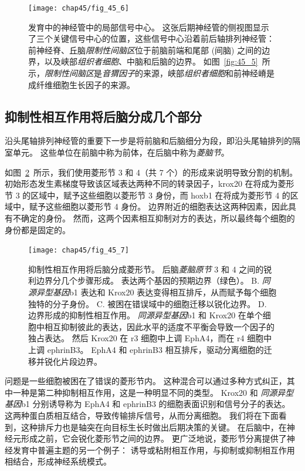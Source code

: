 \begin{figure}[htbp]
	\centering
	\texttt{[image: chap45/fig\_45\_6]}
	\caption{发育中的神经管中的局部信号中心。
		这张后期神经管的侧视图显示了三个关键信号中心的位置，这些信号中心沿着前后轴排列神经管：
		前神经脊、丘脑\textit{限制性间脑区}位于前脑前端和尾部 (间脑) 之间的边界，以及峡部\textit{组织者细胞}、中脑和后脑的边界。
		如图~\ref{fig:45_5}~所示，\textit{限制性间脑区}是\textit{音猬因子}的来源，峡部\textit{组织者细胞}和前神经嵴是成纤维细胞生长因子的来源。}
	\label{fig:45_6}
\end{figure}



\subsection{抑制性相互作用将后脑分成几个部分}

沿头尾轴排列神经管的重要下一步是将前脑和后脑细分为段，即沿头尾轴排列的隔室单元。
这些单位在前脑中称为前体，在后脑中称为\textit{菱脑节}。


如图~\ref{fig:45_7}~所示，我们使用菱形节 3 和 4（共 7 个）的形成来说明导致分割的机制。
初始形态发生素梯度导致该区域表达两种不同的转录因子，krox20 在将成为菱形节 3 的区域中，赋予这些细胞以菱形节 3 身份，而 hoxb1 在将成为菱形节 4 的区域中，赋予这些细胞以菱形节 4 身份。
边界附近的细胞表达这两种因素，因此具有不确定的身份。
然而，这两个因素相互抑制对方的表达，所以最终每个细胞的身份都是固定的。


\begin{figure}[htbp]
	\centering
	\texttt{[image: chap45/fig\_45\_7]}
	\caption{抑制性相互作用将后脑分成菱形节。
		后脑\textit{菱脑原节} 3 和 4 之间的锐利边界分几个步骤形成\cite{addison2016segment}。
		表达两个基因的预期边界（绿色）。
		B. \textit{同源异型基因}b1 表达和 Krox20 表达变得相互排斥，从而赋予每个细胞独特的分子身份。
		C. 被困在错误域中的细胞迁移以锐化边界。
		D. 边界形成的抑制性相互作用。
		\textit{同源异型基因}b1 和 Krox20 在单个细胞中相互抑制彼此的表达，因此水平的适度不平衡会导致一个因子的独占表达。
		然后 Krox20 在 r3 细胞中上调 EphA4，而在 r4 细胞中上调 ephrinB3。
		EphA4 和 ephrinB3 相互排斥，驱动分离细胞的迁移并锐化片段边界。}
	\label{fig:45_7}
\end{figure}


问题是一些细胞被困在了错误的菱形节内。
这种混合可以通过多种方式纠正，其中一种是第二种抑制相互作用，这是一种明显不同的类型。
Krox20 和 \textit{同源异型基因}b1 分别诱导称为 EphA4 和 ephrinB3 的细胞表面识别和信号分子的表达。
这两种蛋白质相互结合，导致传输排斥信号，从而分离细胞。
我们将在下面看到，这种排斥力也是轴突在向目标生长时做出后期决策的关键。
在后脑中，在神经元形成之前，它会锐化菱形节之间的边界。
更广泛地说，菱形节分离提供了神经发育中普遍主题的另一个例子：
诱导或粘附相互作用，与抑制或抑制相互作用相结合，形成神经系统模式。




